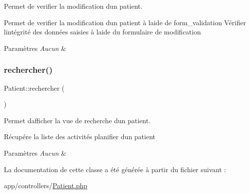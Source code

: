 Permet de verifier la modification d\textquotesingle{}un patient. 

Permet de verifier la modification d\textquotesingle{}un patient à l\textquotesingle{}aide de form\+\_\+validation Vérifier l\textquotesingle{}intégrité des données saisies à l\textquotesingle{}aide du formulaire de modification 
\begin{DoxyParams}{Paramètres}
{\em Aucun} & \\
\hline
\end{DoxyParams}
\mbox{\label{class_patient_ad652801d1938a0d4c4b66e04c1c34f17}} 
\subsubsection{\texorpdfstring{rechercher()}{rechercher()}}
{\footnotesize\ttfamily Patient\+::rechercher (\begin{DoxyParamCaption}{ }\end{DoxyParamCaption})}



Permet d\textquotesingle{}afficher la vue de recherche d\textquotesingle{}un patient. 

Récupére la liste des activités planifier d\textquotesingle{}un patient 
\begin{DoxyParams}{Paramètres}
{\em Aucun} & \\
\hline
\end{DoxyParams}


La documentation de cette classe a été générée à partir du fichier suivant \+:\begin{DoxyCompactItemize}
\item 
app/controllers/\hyperlink{_patient_8php}{Patient.\+php}\end{DoxyCompactItemize}

